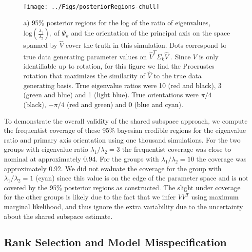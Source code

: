 \documentclass{statsoc}
\begin{document}
\begin{figure}[t]
    \centering
    \texttt{[image: ../Figs/posteriorRegions-chull]}
        \label{fig:simPosterior}
    \caption{a) 95\% posterior regions for the log of the ratio of
      eigenvalues, $\text{log}(\frac{\lambda_1}{\lambda_2})$, of $\Psi_k$ and the
      orientation of the principal axis on the space spanned by $\hat{V}$
      cover the truth in this simulation.  Dots correspond to true data generating
      parameter values on $\hat{V}^T\Sigma_k\hat{V}$ .  Since $V$
      is only identifiable up to rotation, for this figure we find the Procrustes
      rotation that maximizes the similarity of $\hat{V}$ to the true
      data generating basis. True eigenvalue ratios were 10 (red and
      black), 3 (green and blue) and 1 (light blue).  True
      orientations were $\pi/4$ (black), $-\pi/4$ (red and green) and
      0 (blue and cyan). %
    }
\end{figure}

To demonstrate the overall validity of the shared subspace approach,
we compute the frequentist coverage of these 95\% bayesian credible
regions for the eigenvalue ratio and primary axis orientation using
one thousand simulations.  For the two groups with eigenvalue ratio
$\lambda_1/\lambda_2 = 3$ the frequentist coverage was close to
nominal at approximately 0.94.  For the groups with
$\lambda_1/\lambda_2 = 10$ the coverage was approximately 0.92.  We
did not evaluate the coverage for the group with
$\lambda_1/\lambda_2 = 1$ (cyan) since this value is on the edge of the
parameter space and is not covered by the 95\% posterior regions
as constructed.  The slight under coverage for the other groups is likely due to the fact
that we infer $VV^T$ using maximum marginal likelihood, and thus
ignore the extra variability due to the uncertainty about the shared
subspace estimate.

\subsection{Rank Selection and Model Misspecification}
\end{document}

